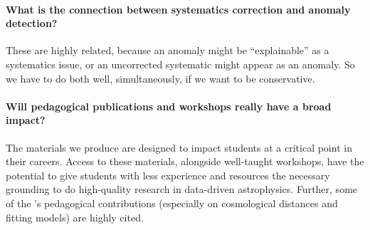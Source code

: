 \documentclass[12pt, fullpage, letterpaper]{article}
\begin{document}
\paragraph{What is the connection between systematics correction and anomaly detection?}
These are highly related, because an anomaly might be ``explainable'' as a systematics issue, or an uncorrected systematic might appear as an anomaly. So we have to do both well, simultaneously, if we want to be conservative.

\paragraph{Will pedagogical publications and workshops really have a broad impact?}
The materials we produce are designed to impact students at a critical point in their careers.
Access to these materials, alongside well-taught workshops, have the potential to give students with less experience and resources the necessary grounding to do high-quality research in data-driven astrophysics.
Further, some of the \PI's pedagogical contributions (especially on cosmological distances and fitting models) are highly cited.

\clearpage


\end{document}
